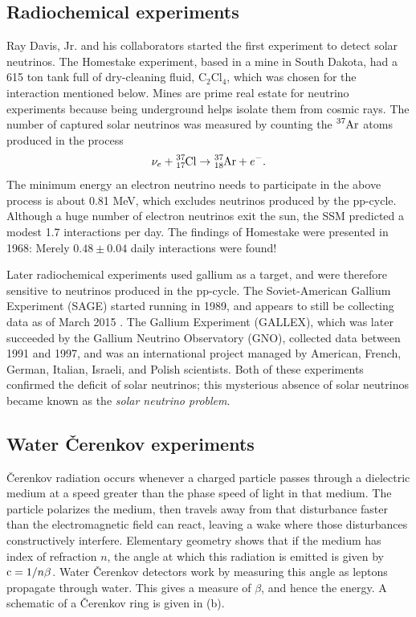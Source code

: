 \subsection{Radiochemical experiments}
Ray Davis, Jr. and his collaborators started the first experiment to detect
solar neutrinos. The Homestake experiment, based in a mine in South Dakota,
had a 615 ton tank full of dry-cleaning fluid, $\text{C}_2\text{Cl}_4$,
which was chosen for the interaction mentioned below.
Mines are prime real estate for neutrino experiments because being underground
helps isolate them from cosmic rays. The number of captured solar neutrinos
was measured by counting the $\ce{^{37}Ar}$ atoms produced in
the process
\begin{equation}
  \nu_e+\ce{^{37}_{17}Cl}\to\ce{^{37}_{18}Ar}+e^-.
\end{equation}
The minimum energy an electron neutrino needs to participate in the above
process is about 0.81 MeV, which excludes neutrinos produced by the pp-cycle.
Although a huge number of electron neutrinos exit the sun, the SSM
predicted a modest 1.7 interactions per day. The findings
of Homestake were presented in 1968: Merely $0.48\pm0.04$ daily interactions
were found!

Later radiochemical experiments used gallium as a target, and were therefore
sensitive to neutrinos produced in the pp-cycle. The Soviet-American
Gallium Experiment (SAGE) started running in 1989, and appears to still be
collecting data as of March 2015 \cite{gavrin_current_2015}. 
The Gallium Experiment (GALLEX),
which was later succeeded by the Gallium Neutrino Observatory (GNO),
collected data between 1991 and 1997, and was an international project
managed by American, French, German, Italian, Israeli, and Polish scientists.
Both of these experiments confirmed the deficit of solar neutrinos; this
mysterious absence of solar neutrinos became known as the {\it solar
neutrino problem}.

\subsection{Water \v{C}erenkov experiments}
\v{C}erenkov radiation occurs whenever a charged particle passes through a
dielectric medium at a speed greater than the phase speed of light in that
medium. The particle polarizes the medium, then travels away from that
disturbance faster than the electromagnetic field can react, leaving
a wake where those disturbances constructively interfere. Elementary
geometry shows that if the medium has index of refraction $n$, the angle
at which this radiation is emitted is given by $\operatorname{c}=1/n\beta$. Water
\v{C}erenkov detectors work by measuring this angle as leptons propagate
through water. This gives a measure of $\beta$, and hence the energy.
A schematic of a \v{C}erenkov ring is given in  (b).

